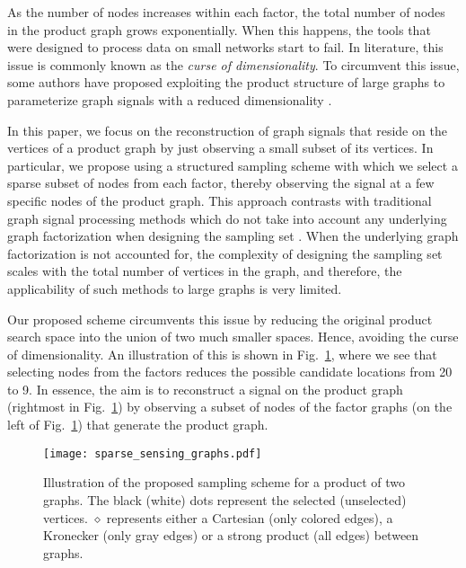 \documentclass{article}
\begin{document}
As the number of nodes increases within each factor, the total number of nodes in the product graph grows exponentially. When this happens, the tools that were designed to process data on small networks start to fail. In literature, this issue is commonly known as the \emph{curse of dimensionality}. To circumvent this issue, some authors have proposed exploiting the product structure of large graphs to parameterize graph signals with a reduced dimensionality \cite{moura}. 

In this paper, we focus on the reconstruction of graph signals that reside on the vertices of a product graph by just observing a small subset of its vertices. In particular, we propose using a structured sampling scheme with which we select a sparse subset of nodes from each factor, thereby observing the signal at a few specific nodes of the product graph. This approach contrasts with traditional graph signal processing methods which do not take into account any underlying graph factorization when designing the sampling set \cite{barbarossa,sampling_graph,sampling_graph_2,sampling_graph_3,covariance_journal,covariance_yonina,giannakis}. When the underlying graph factorization is not accounted for, the complexity of designing the sampling set scales with the total number of vertices in the graph, and therefore, the applicability of such methods to large graphs is very limited.

Our proposed scheme circumvents this issue by reducing the original product search space into the union of two much smaller spaces. Hence, avoiding the curse of dimensionality. An illustration of this is shown in Fig.~\ref{fig:sparsesensing}, where we see that selecting nodes from the factors reduces the possible candidate locations from 20 to 9. In essence, the aim is to reconstruct a signal on the product graph (rightmost in Fig.~\ref{fig:sparsesensing}) by observing a subset of nodes of the factor graphs (on the left of Fig.~\ref{fig:sparsesensing}) that generate the product graph. 

\begin{figure}[t!]
	\centering
	\texttt{[image: sparse\_sensing\_graphs.pdf]}
	\caption{Illustration of the proposed sampling scheme for a product of two graphs. The black (white) dots represent the selected (unselected) vertices. $\diamond$ represents either a Cartesian (only colored edges), a Kronecker (only gray edges) or a strong product (all edges) between graphs. }
	\label{fig:sparsesensing}
\end{figure}
\end{document}
